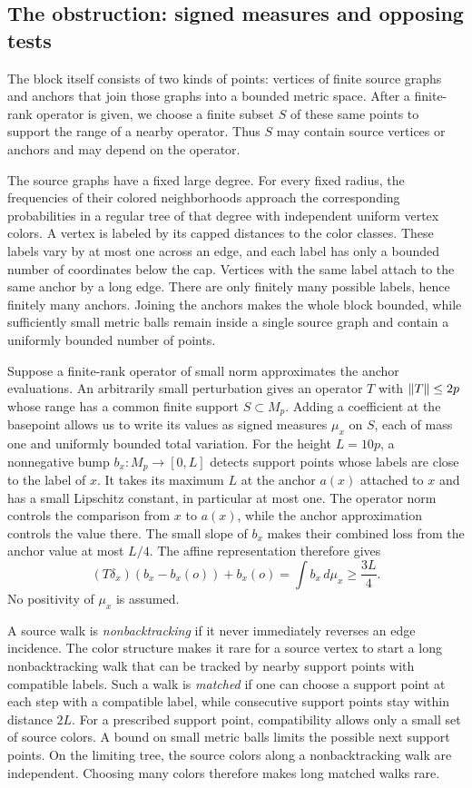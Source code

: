 \subsection{The obstruction: signed measures and opposing tests}

The block itself consists of two kinds of points: vertices of finite source
graphs and anchors that join those graphs into a bounded metric space.
After a finite-rank operator is given, we choose a finite subset $S$ of
these same points to support the range of a nearby operator. Thus $S$ may
contain source vertices or anchors and may depend on the operator.

The source graphs have a fixed large degree. For every fixed radius, the
frequencies of their colored neighborhoods approach the corresponding
probabilities in a regular tree of that degree with independent uniform
vertex colors. A vertex is labeled by its
capped distances to the color classes. These labels vary by at most one
across an edge, and each label has only a bounded number of coordinates
below the cap. Vertices with the same label attach to the same anchor
by a long edge. There are only finitely many possible labels, hence
finitely many anchors. Joining the anchors makes the whole block bounded,
while sufficiently small metric balls remain inside a single source
graph and contain a uniformly bounded number of points.

Suppose a finite-rank operator of small norm approximates the
anchor evaluations. An arbitrarily small perturbation gives an operator
$T$ with $\left\|T\right\|\le2p$ whose range has a common finite support
$S\subset M_p$. Adding a coefficient at the
basepoint allows us to write its values as signed measures $\mu_x$ on
$S$, each of mass one and uniformly bounded total variation. For the
height $L=10p$, a nonnegative bump $b_x:M_p\to[0,L]$ detects support points
whose labels are close to the label of $x$. It takes its maximum $L$ at the
anchor $a(x)$ attached to $x$ and has a small Lipschitz constant, in
particular at most one. The operator norm controls the comparison from
$x$ to $a(x)$, while the anchor approximation controls the value there.
The small slope of $b_x$ makes their combined loss from the anchor value
at most $L/4$. The affine representation therefore gives
\[
 (T\delta_x)(b_x-b_x(o))+b_x(o)=\int b_x\,d\mu_x\ge\frac{3L}{4}.
\]
No positivity of $\mu_x$ is assumed.

A source walk is \emph{nonbacktracking} if it never immediately reverses
an edge incidence. The color structure makes it rare for a source vertex
to start a long nonbacktracking walk that can be tracked by nearby support
points with compatible labels. Such a walk is \emph{matched} if one can
choose a support point at each step with a compatible label, while
consecutive support points stay within distance $2L$. For a prescribed
support point, compatibility allows only a
small set of source colors. A bound on small metric balls limits the
possible next support points. On the limiting tree, the source colors
along a nonbacktracking walk are independent. Choosing many colors
therefore makes long matched walks rare.

